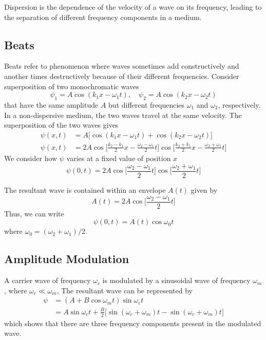 \documentclass[../../../main.tex]{subfiles}
\begin{document}
Dispersion is the dependence of the velocity of a wave on its frequency, leading to the separation of different frequency components in a medium.
\subsection*{Beats}
Beats refer to phenomenon where waves sometimes add constructively and another times destructively because of their different frequencies. Consider superposition of two monochromatic waves
\begin{equation*}
    \psi_1=A \cos(k_1x - \omega_1t),\quad \psi_2=A \cos(k_2x - \omega_2t)
\end{equation*}
that have the same amplitude $A$ but different frequencies $\omega_1$ and $\omega_2$, respectively. In a non-dispersive medium, the two waves travel at the same velocity. The superposition of the two waves gives
\begin{align*}
    \psi(x,t)&=A\big[\cos(k_1x - \omega_1t)+ \cos(k_2x - \omega_2t)\big]\\
    \psi(x,t)&=2A\cos\bigg[\frac{k_2-k_1}{2}x-\frac{\omega_2-\omega_1}{2}t]\cos\bigg[\frac{k_2+k_1}{2}x-\frac{\omega_2+\omega_1}{2}t\bigg]
\end{align*}
We consider how $\psi$ varies at a ﬁxed value of position $x$
\begin{equation*}
    \psi(0,t)=2A\cos\bigg[\frac{\omega_2-\omega_1}{2}t\bigg] \cos\bigg[\frac{\omega_2+\omega_1}{2}t\bigg]
\end{equation*}

The resultant wave is contained within an envelope $A(t)$ given by
\begin{equation*}
    A(t)=2A\cos\bigg[\frac{\omega_2-\omega_1}{2}t\bigg]
\end{equation*}
Thus, we can write 
\begin{equation*}
    \psi(0,t)=A(t)\cos \omega_0 t
\end{equation*}
where $\omega_0=(\omega_2+\omega_1)/2$.

\subsection*{Amplitude Modulation}
A carrier wave of frequency $\omega_c$ is modulated by a sinusoidal wave of frequency $\omega_m$, where $\omega_c \ll \omega_m$, The resultant wave can be represented by
\begin{align*}
    \psi &= (A + B \cos \omega_mt) \sin \omega_ct\\
    &=A\sin \omega_ct+\frac{B}{2}\big[\sin (\omega_c+\omega_m)t-\sin (\omega_c+\omega_m)t\big]
\end{align*}
which shows that there are three frequency components present in the modulated wave. 
\end{document}
